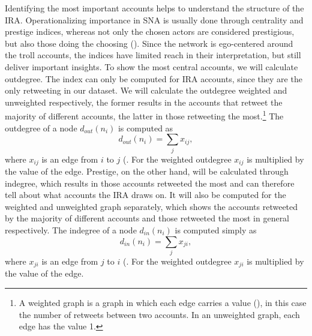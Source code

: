 \documentclass[12pt, titlepage=true, toc=bib]{scrartcl}
\begin{document}
Identifying the most important accounts helps to understand the structure of the IRA. Operationalizing importance in SNA is usually done through centrality and prestige indices, whereas not only the chosen actors are considered prestigious, but also those doing the choosing (\cite[170]{wasserman_social_1994}). Since the network is ego-centered around the troll accounts, the indices have limited reach in their interpretation, but still deliver important insights. To show the most central accounts, we will calculate outdegree. The index can only be computed for IRA accounts, since they are the only retweeting in our dataset. We will calculate the outdegree weighted and unweighted respectively, the former results in the accounts that retweet the majority of different accounts, the latter in those retweeting the most.\footnote{A weighted graph is a graph in which each edge carries a value (\cite[140]{wasserman_social_1994}), in this case the number of retweets between two accounts. In an unweighted graph, each edge has the value 1.} The outdegree of a node \( d_{out}(n_{i}) \) is computed as \[ d_{out}(n_{i}) = \sum_{j} x_{ij} ,\] where \( x_{ij} \) is an edge from \( i \) to \( j \) (\cite[cf.][178]{wasserman_social_1994}. For the weighted outdegree \( x_{ij} \) is multiplied by the value of the edge. Prestige, on the other hand, will be calculated through indegree, which results in those accounts retweeted the most and can therefore tell about what accounts the IRA draws on. It will also be computed for the weighted and unweighted graph separately, which shows the accounts retweeted by the majority of different accounts and those retweeted the most in general respectively. The indegree of a node \( d_{in}(n_{i}) \) is computed simply as \[ d_{in}(n_{i}) = \sum_{j} x_{ji} ,\] where \( x_{ji} \) is an edge from \( j \) to \( i \) (\cite[cf.][202]{wasserman_social_1994}. For the weighted outdegree \( x_{ji} \) is multiplied by the value of the edge.
\end{document}
